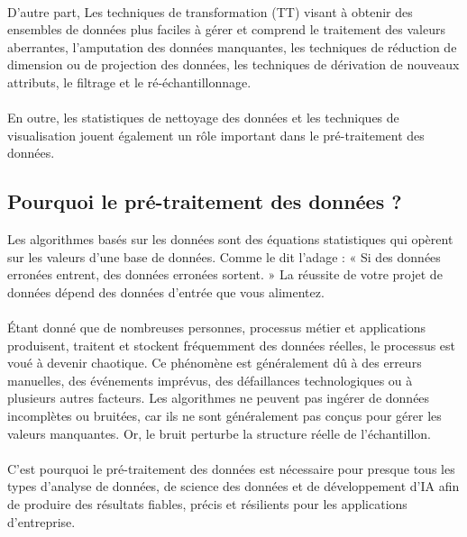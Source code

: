 \documentclass[a4paper, 12pt]{article}
\begin{document}
	\paragraph{}D'autre part, Les techniques de transformation (TT) visant à obtenir des ensembles de données plus faciles à gérer et  comprend le traitement des valeurs aberrantes, l'amputation des données manquantes, les techniques de réduction de dimension ou de projection des données, les techniques de dérivation de nouveaux attributs, le filtrage et le ré-échantillonnage. 
	\paragraph{}En outre, les statistiques de nettoyage des données et les techniques de visualisation jouent également un rôle important dans le pré-traitement des données. 
	\subsection{Pourquoi le pré-traitement des données ?}Les algorithmes basés sur les données sont des équations statistiques qui opèrent sur les valeurs d'une base de données. Comme le dit l'adage : « Si des données erronées entrent, des données erronées sortent. » La réussite de votre projet de données dépend des données d'entrée que vous alimentez.
	\paragraph{}Étant donné que de nombreuses personnes, processus métier et applications produisent, traitent et stockent fréquemment des données réelles, le processus est voué à devenir chaotique. Ce phénomène est généralement dû à des erreurs manuelles, des événements imprévus, des défaillances technologiques ou à plusieurs autres facteurs. Les algorithmes ne peuvent pas ingérer de données incomplètes ou bruitées, car ils ne sont généralement pas conçus pour gérer les valeurs manquantes. Or, le bruit perturbe la structure réelle de l'échantillon.
	\paragraph{}C'est pourquoi le pré-traitement des données est nécessaire pour presque tous les types d'analyse de données, de science des données et de développement d'IA afin de produire des résultats fiables, précis et résilients pour les applications d'entreprise.
\end{document}
